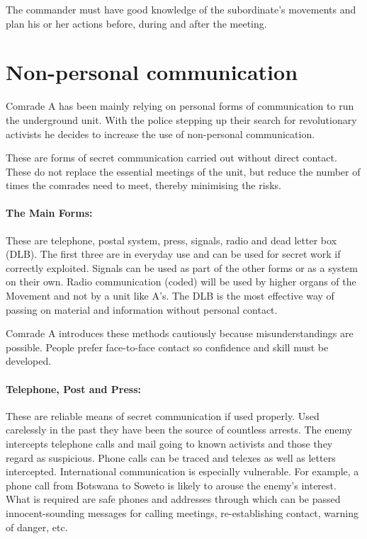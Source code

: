 The commander must have good knowledge of the subordinate's movements
and plan his or her actions before, during and after the meeting.

\section{Non-personal communication}

Comrade A has been mainly relying on personal forms of communication to
run the underground unit. With the police stepping up their search for
revolutionary activists he decides to increase the use of non-personal
communication.

These are forms of secret communication carried out without direct
contact. These do not replace the essential meetings of the unit, but
reduce the number of times the comrades need to meet, thereby minimising
the risks.

\paragraph{The Main Forms:}

These are telephone, postal system, press, signals, radio and dead
letter box (DLB). The first three are in everyday use and can be used
for secret work if correctly exploited. Signals can be used as part of
the other forms or as a system on their own. Radio communication (coded)
will be used by higher organs of the Movement and not by a unit like
A's. The DLB is the most effective way of passing on material and
information without personal contact.

Comrade A introduces these methods cautiously because misunderstandings
are possible. People prefer face-to-face contact so confidence and skill
must be developed.

\paragraph{Telephone, Post and Press:}

These are reliable means of secret communication if used properly. Used
carelessly in the past they have been the source of countless arrests.
The enemy intercepts telephone calls and mail going to known activists
and those they regard as suspicious. Phone calls can be traced and
telexes as well as letters intercepted. International communication is
especially vulnerable. For example, a phone call from Botswana to Soweto
is likely to arouse the enemy's interest. What is required are safe
phones and addresses through which can be passed innocent-sounding
messages for calling meetings, re-establishing contact, warning of
danger, etc.

